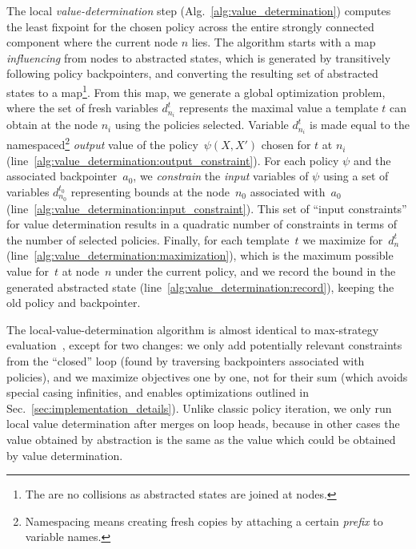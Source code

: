 \documentclass{llncs}
\begin{document}
The local \emph{value-determination} step (Alg.~\ref{alg:value_determination})
computes the least fixpoint for the chosen policy across the entire strongly
connected component where the current node $n$ lies.
The algorithm starts with a map \emph{influencing} from nodes to  abstracted
states, which is generated by transitively following policy backpointers,
and converting the resulting set of abstracted states to a map\footnote{The are no collisions as abstracted
    states are joined at nodes.}.
From this map, we generate a global optimization problem, where the set of
fresh variables $d_{n_i}^{t}$ represents the maximal value a template $t$ can obtain
at the node $n_i$ using the policies selected.
Variable $d_{n_i}^t$ is made equal to the namespaced\footnote{Namespacing means creating fresh copies by attaching a certain \emph{prefix}
to variable names.} \emph{output} value of the
policy~$\psi(X, X')$ chosen for $t$ at $n_i$
(line~\ref{alg:value_determination:output_constraint}).
For each policy $\psi$ and the associated backpointer~$a_0$, we \emph{constrain}
the \emph{input} variables of $\psi$ using a set of variables $d_{n_0}^{t_0}$
representing bounds at the node~$n_0$ associated with~$a_0$
(line~\ref{alg:value_determination:input_constraint}).
This set of ``input constraints'' for value determination results in a quadratic
number of constraints in terms of the number of selected policies.
Finally, for each template~$t$ we maximize for~$d_n^t$
(line~\ref{alg:value_determination:maximization}),
which is the maximum possible value for~$t$ at node~$n$
under the current policy, and we
record the bound in the generated abstracted state
(line~\ref{alg:value_determination:record}),
keeping the old policy and backpointer.

The local-value-determination algorithm is almost identical to max-strategy
evaluation~\cite{policy_iteration_path_focusing},
except for two changes: we only add potentially relevant constraints from the
``closed'' loop (found by traversing backpointers associated with policies),
and we maximize objectives one by one,
not for their sum (which avoids special casing
infinities, and enables optimizations outlined in
Sec.~\ref{sec:implementation_details}).
Unlike classic policy iteration, we only run local value determination
after merges on loop heads,
because in other cases the value obtained by abstraction is the same as the
value which could be obtained by value determination.
\end{document}
